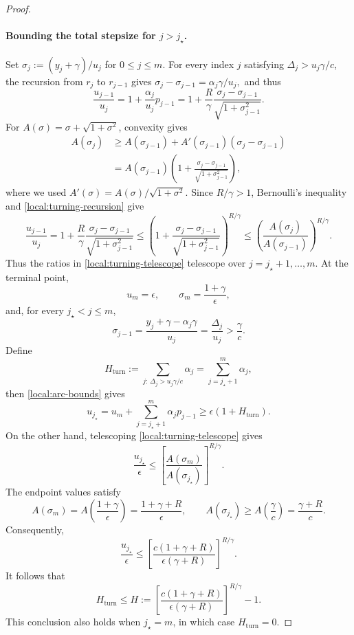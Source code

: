 \documentclass[11pt,letterpaper]{article}
\theoremstyle{definition}
\begin{document}
\begin{proof}
\paragraph{Bounding the total stepsize for $j>j_\star$.}
\label{local:turning-proof}

Set $\sigma_j:=(y_j+\gamma)/u_j$ for $0\le j\le m$.
For every index $j$ satisfying $\Delta_j>u_j\gamma/c$, the recursion from $r_j$ to $r_{j-1}$ gives
\(\sigma_j-\sigma_{j-1}=\alpha_j\gamma/u_j,\) and thus
\begin{equation}
  \frac{u_{j-1}}{u_j}
  =1+\frac{\alpha_j}{u_j}p_{j-1}
  =1+\frac R\gamma
    \frac{\sigma_j-\sigma_{j-1}}
         {\sqrt{1+\sigma_{j-1}^2}}.
  \label{local:turning-recursion}
\end{equation}
For $A(\sigma)=\sigma+\sqrt{1+\sigma^2}$, convexity gives
\[
\begin{aligned}
  A(\sigma_j)
  &\ge A(\sigma_{j-1})
     +A'(\sigma_{j-1})(\sigma_j-\sigma_{j-1})\\
  &=A(\sigma_{j-1})\left(
     1+\frac{\sigma_j-\sigma_{j-1}}
              {\sqrt{1+\sigma_{j-1}^2}}
     \right),
\end{aligned}
\]
where we used $A'(\sigma)=A(\sigma)/\sqrt{1+\sigma^2}$.
Since $R/\gamma>1$, Bernoulli's inequality and \eqref{local:turning-recursion} give
\begin{equation}
  \frac{u_{j-1}}{u_j}
  =1+\frac R\gamma \frac{\sigma_j-\sigma_{j-1}}{\sqrt{1+\sigma_{j-1}^2}}
  \le\left(1+\frac{\sigma_j-\sigma_{j-1}}{\sqrt{1+\sigma_{j-1}^2}}\right)^{R/\gamma}
  \le\left(
    \frac{A(\sigma_j)}{A(\sigma_{j-1})}
  \right)^{R/\gamma}.
  \label{local:turning-telescope}
\end{equation}
Thus the ratios in \eqref{local:turning-telescope} telescope over $j=j_\star+1,\ldots,m$.
At the terminal point,
\[
  u_m=\epsilon,\qquad \sigma_m=\frac{1+\gamma}{\epsilon},
\]
and, for every $j_\star<j\le m$,
\[
  \sigma_{j-1}
  =\frac{y_j+\gamma-\alpha_j\gamma}{u_j}
  =\frac{\Delta_j}{u_j}
  >\frac\gamma c.
\]
Define
\[
  H_{\mathrm{turn}}
  :=\sum_{j:\,\Delta_j>u_j\gamma/c}\alpha_j
  =\sum_{j=j_\star+1}^m\alpha_j,
\]
then \eqref{local:arc-bounds} gives
\[
  u_{j_\star}
  =u_m+\sum_{j=j_\star+1}^m\alpha_jp_{j-1}
  \ge\epsilon(1+H_{\mathrm{turn}}).
\]
On the other hand, telescoping \eqref{local:turning-telescope} gives
\[
  \frac{u_{j_\star}}{\epsilon}
  \le\left[
    \frac{A(\sigma_m)}{A(\sigma_{j_\star})}
  \right]^{R/\gamma}.
\]
The endpoint values satisfy
\[
  A(\sigma_m)
  =A\!\left(\frac{1+\gamma}{\epsilon}\right)
  =\frac{1+\gamma+R}{\epsilon},
  \qquad
  A(\sigma_{j_\star})
  \ge A\!\left(\frac\gamma c\right)
  =\frac{\gamma+R}{c}.
\]
Consequently,
\[
  \frac{u_{j_\star}}{\epsilon}
  \le\left[
    \frac{c(1+\gamma+R)}{\epsilon(\gamma+R)}
  \right]^{R/\gamma}.
\]
It follows that
\begin{equation*}
  H_{\mathrm{turn}}\le H
  :=\left[\frac{c(1+\gamma+R)}{\epsilon(\gamma+R)}\right]^{R/\gamma}-1.
\end{equation*}
This conclusion also holds when $j_\star=m$, in which case $H_{\mathrm{turn}}=0$.


\end{proof}
\end{document}
